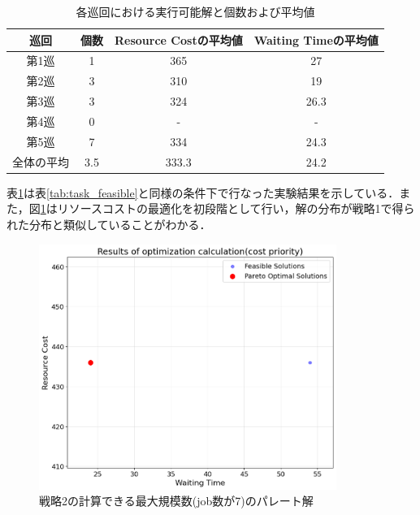 \begin{table}[ht]
    \centering
    \vspace{-0.3cm}
    \caption{各巡回における実行可能解と個数および平均値}
    \begin{tabular}{|c|c|c|c|}
        \hline
         巡回 & 個数 & Resource Costの平均値 & Waiting Timeの平均値 \\
        \hline
        第1巡 & 1 & 365 & 27 \\
        \hline
        第2巡 & 3 & 310 & 19 \\
        \hline
        第3巡 & 3 & 324 & 26.3 \\
        \hline
        第4巡 & 0 & - & - \\
        \hline
        第5巡 & 7 & 334 & 24.3 \\
        \hline
        全体の平均 & 3.5 & 333.3 & 24.2 \\
        \hline
    \end{tabular}
    \label{tab:cost_feasible}
\end{table}

表\ref{tab:cost_feasible}は表\ref{tab:task_feasible}と同様の条件下で行なった実験結果を示している．また，図\ref{fig:fig8}はリソースコストの最適化を初段階として行い，解の分布が戦略1で得られた分布と類似していることがわかる．

\begin{figure}[H]
    \centering
    \includegraphics[width=0.8\linewidth, height=8cm]{./images/cost_job7.png}
    \caption{戦略2の計算できる最大規模数(job数が7)のパレート解}
    \label{fig:fig8}
\end{figure}

